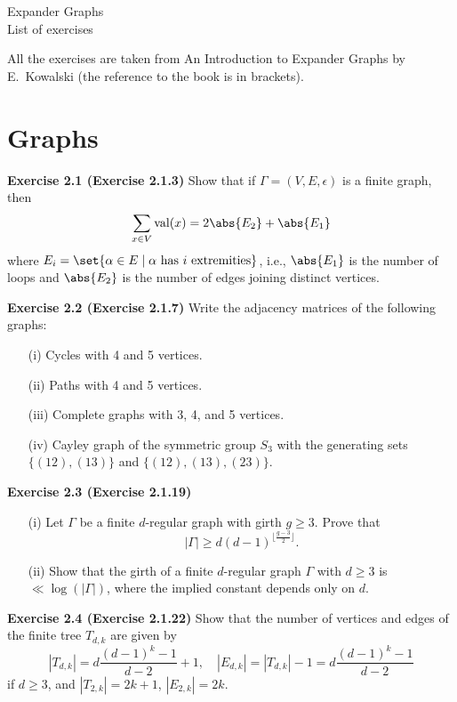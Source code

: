 \documentclass[12pt, a4paper]{article}
\begin{document}
\Huge
\begin{center}
    Expander Graphs \\
    \Large
    List of exercises
\end{center}
\normalsize
All the exercises are taken from An Introduction to Expander Graphs by E.~Kowalski %
(the reference to the book is in brackets).

\setcounter{section}{1}
\section{Graphs}

\textbf{Exercise 2.1 (Exercise 2.1.3)}
Show that if $\Gamma = (V, E, \epsilon)$ is a finite graph, then
\[
\sum_{x \in V} \text{val}(x) = 2\abs{E_2} + \abs{E_1}
\]
where $E_i = \set{\alpha \in E \mid \alpha \text{ has } i \text{ extremities}}$, 
i.e., $\abs{E_1}$ is the number of loops and $\abs{E_2}$ is the number of edges joining distinct vertices.

\textbf{Exercise 2.2 (Exercise 2.1.7)}
Write the adjacency matrices of the following graphs:
\begin{itemize}
    \item[(i)] Cycles with 4 and 5 vertices.
    \item[(ii)] Paths with 4 and 5 vertices.
    \item[(iii)] Complete graphs with 3, 4, and 5 vertices.
    \item[(iv)] Cayley graph of the symmetric group $S_3$ with the generating sets $\{(12), (13)\}$ and $\{(12), (13), (23)\}$.
\end{itemize}

\textbf{Exercise 2.3 (Exercise 2.1.19)}
\begin{itemize}
    \item[(i)] Let $\Gamma$ be a finite $d$-regular graph with girth $g \geq 3$. Prove that
    \[
    |\Gamma| \geq d(d-1)^{\lfloor \frac{g-3}{2} \rfloor}.
    \]
    \item[(ii)] Show that the girth of a finite $d$-regular graph $\Gamma$ with $d \geq 3$ is $\ll \log(|\Gamma|)$, where the implied constant depends only on $d$.
\end{itemize}

\textbf{Exercise 2.4 (Exercise 2.1.22)}
Show that the number of vertices and edges of the finite tree $T_{d,k}$ are given by
\[
|T_{d,k}| = d \frac{(d-1)^k - 1}{d-2} + 1, \quad |E_{d,k}| = |T_{d,k}| - 1 = d \frac{(d-1)^k - 1}{d-2}
\]
if $d \geq 3$, and $|T_{2,k}| = 2k + 1$, $|E_{2,k}| = 2k$.
\end{document}
